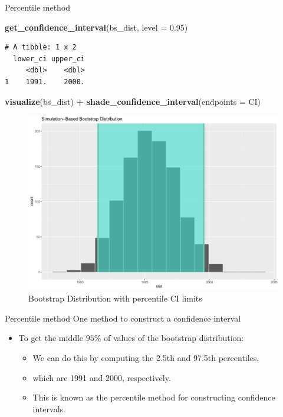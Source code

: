 \documentclass[
  ignorenonframetext,
]{beamer}
\newenvironment{Shaded}{\begin{snugshade}}{\end{snugshade}}
\newcommand{\AttributeTok}[1]{\textcolor[rgb]{0.13,0.29,0.53}{#1}}
\newcommand{\FloatTok}[1]{\textcolor[rgb]{0.00,0.00,0.81}{#1}}
\newcommand{\FunctionTok}[1]{\textcolor[rgb]{0.13,0.29,0.53}{\textbf{#1}}}
\newcommand{\NormalTok}[1]{#1}
\newcommand{\SpecialCharTok}[1]{\textcolor[rgb]{0.81,0.36,0.00}{\textbf{#1}}}
\providecommand{\tightlist}{%
  \setlength{\itemsep}{0pt}\setlength{\parskip}{0pt}}
\begin{document}
\begin{frame}[fragile]{Percentile method}
\protect\hypertarget{percentile-method-1}{}
\small

\begin{Shaded}
\begin{Highlighting}[]
\FunctionTok{get\_confidence\_interval}\NormalTok{(bs\_dist, }\AttributeTok{level =} \FloatTok{0.95}\NormalTok{)}
\end{Highlighting}
\end{Shaded}

\begin{verbatim}
# A tibble: 1 x 2
  lower_ci upper_ci
     <dbl>    <dbl>
1    1991.    2000.
\end{verbatim}

\begin{Shaded}
\begin{Highlighting}[]
\FunctionTok{visualize}\NormalTok{(bs\_dist) }\SpecialCharTok{+} 
  \FunctionTok{shade\_confidence\_interval}\NormalTok{(}\AttributeTok{endpoints =}\NormalTok{ CI)}
\end{Highlighting}
\end{Shaded}

\begin{figure}

{\centering \includegraphics[width=0.5\linewidth,height=0.4\textheight]{Week10A_files/figure-beamer/bsci-1} 

}

\caption{Bootstrap Distribution with percentile CI limits}\label{fig:bsci}
\end{figure}
\normalsize
\end{frame}

\begin{frame}{Percentile method}
\protect\hypertarget{percentile-method-2}{}
One method to construct a confidence interval

\begin{itemize}
\item
  To get the middle \(95\%\) of values of the bootstrap distribution:

  \begin{itemize}
  \tightlist
  \item
    We can do this by computing the 2.5th and 97.5th percentiles,
  \item
    which are 1991 and 2000, respectively.
  \item
    This is known as the percentile method for constructing confidence
    intervals.
  \end{itemize}
\end{itemize}
\end{frame}
\end{document}
